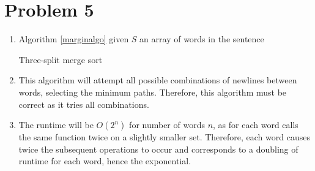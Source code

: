 \documentclass{article}
\begin{document}
\section{Problem 5}

\begin{enumerate}[label=\alph*.]
    \item Algorithm \ref{marginalgo} given $S$ an array of words in the sentence

    \begin{algorithm}
        \caption{Three-split merge sort}
        \label{marginalgo}
    \end{algorithm}

    \item This algorithm will attempt all possible combinations of newlines between words, selecting the minimum paths.
        Therefore, this algorithm must be correct as it tries all combinations.
    \item The runtime will be $O(2^n)$ for number of words $n$, as for each word calls the same function twice
        on a slightly smaller set. Therefore, each word causes twice the subsequent operations to occur and corresponds
        to a doubling of runtime for each word, hence the exponential.
\end{enumerate}
\end{document}

